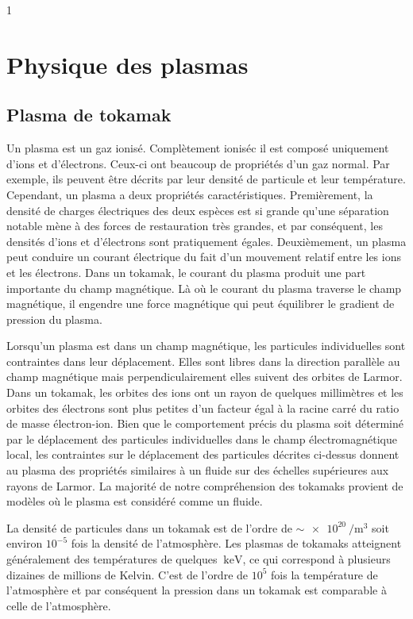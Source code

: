 \documentclass[main.tex]{subfiles}
\begin{document}
\setcounter{chapter} {1}
\chapter{Physique des plasmas}

\section{Plasma de tokamak}
\label{sec:plasma_de_tokamak}

Un plasma est un gaz ionisé.
Complètement ioniséc il est composé uniquement d'ions et d'électrons.
Ceux-ci ont beaucoup de propriétés d'un gaz normal.
Par exemple, ils peuvent être décrits par leur densité de particule et leur température.
Cependant, un plasma a deux propriétés caractéristiques.
Premièrement, la densité de charges électriques des deux espèces est si grande qu'une séparation notable mène à des forces de restauration très grandes, et par conséquent, les densités d'ions et d'électrons sont pratiquement égales.
Deuxièmement, un plasma peut conduire un courant électrique du fait d’un mouvement relatif entre les ions et les électrons.
Dans un tokamak, le courant du plasma produit une part importante du champ magnétique.
Là où le courant du plasma traverse le champ magnétique, il engendre une force magnétique qui peut équilibrer le gradient de pression du plasma.

Lorsqu'un plasma est dans un champ magnétique, les particules individuelles sont con\-traintes dans leur déplacement.
Elles sont libres dans la direction parallèle au champ magnétique mais perpendiculairement elles suivent des orbites de Larmor.
Dans un tokamak, les orbites des ions ont un rayon de quelques millimètres et les orbites des électrons sont plus petites d'un facteur égal à la racine carré du ratio de masse électron-ion.
Bien que le comportement précis du plasma soit déterminé par le déplacement des particules individuelles dans le champ électromagnétique local, les contraintes sur le déplacement des particules décrites ci-dessus donnent au plasma des propriétés similaires à un fluide sur des échelles supérieures aux rayons de Larmor.
La majorité de notre compréhension des tokamaks provient de modèles où le plasma est considéré comme un fluide.

La densité de particules dans un tokamak est de l'ordre de \( \sim \SI{e20}{\per\meter\cubed} \) soit environ \( 10^{-5} \) fois la densité de l'atmosphère.
Les plasmas de tokamaks atteignent généralement des températures de quelques \( \SI{}{\kilo\electronvolt} \), ce qui correspond à plusieurs dizaines de millions de Kelvin.
C'est de l'ordre de \( 10^5 \) fois la température de l'atmosphère et par conséquent la pression dans un tokamak est comparable à celle de l'atmosphère.
\end{document}
